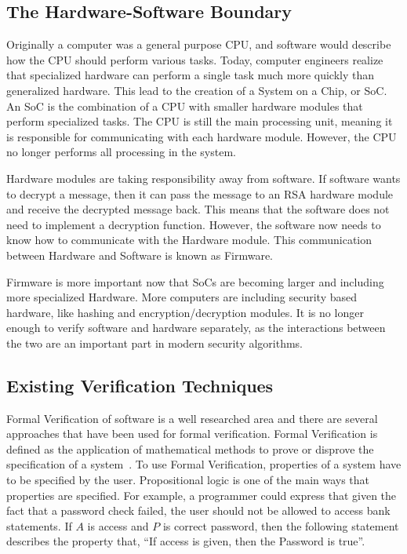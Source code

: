 \documentclass[../report.tex]{subfiles}
\begin{document}
\subsection{The Hardware-Software Boundary}

Originally a computer was a general purpose CPU, and software would
describe how the CPU should perform various tasks.
Today, computer engineers realize that specialized hardware can perform a single
task much more quickly than generalized hardware.
This lead to the creation of a System on a Chip, or SoC. An SoC is the
combination of a CPU with smaller hardware modules that perform specialized
tasks.
The CPU is still the main processing unit, meaning it is responsible for
communicating with each hardware module.
However, the CPU no longer performs all processing in the system.

Hardware modules are taking responsibility away from software.
If software wants to decrypt a message, then it can pass the message to an RSA
hardware module and receive the decrypted message back.
This means that the software does not need to implement a decryption function.
However, the software now needs to know how to communicate with the Hardware
module. This communication between Hardware and Software is known as Firmware.

Firmware is more important now that SoCs are becoming larger and including more
specialized Hardware. 
More computers are including security based hardware, like hashing and encryption/decryption modules.
It is no longer enough to verify software and hardware separately, as the
interactions between the two are an important part in modern security
algorithms.

\subsection{Existing Verification Techniques}

Formal Verification of software is a well researched area and there are several approaches that have been used for formal verification.
Formal Verification is defined as the application of mathematical methods to
prove or disprove the specification of a system~\cite{greenstreet}.
To use Formal Verification, properties of a system have to be specified by the
user. 
Propositional logic is one of the main ways that properties are specified.
For example, a programmer could express that given the fact that a password
check failed, the user should not be allowed to access bank statements.
If $A$ is access and $P$ is correct password, then the following statement
describes the property that, ``If access is given, then the Password is true''.
\end{document}
